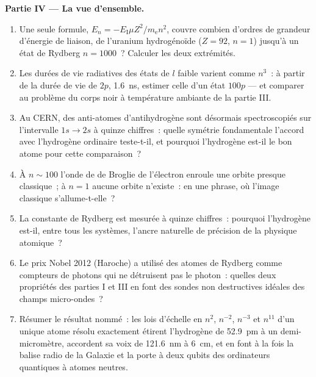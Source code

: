 \begin{problem}
\medskip\noindent\textbf{Partie IV --- La vue d'ensemble.}
\begin{enumerate}[resume]
  \item Une seule formule, $E_n = -E_{\text{I}}\mu Z^2/m_{\text{e}}n^2$,
        couvre combien d'ordres de grandeur d'énergie de liaison, de
        l'uranium hydrogénoïde ($Z = 92$, $n = 1$) jusqu'à un état de
        Rydberg $n = 1000$~? Calculer les deux extrémités.
  \item Les durées de vie radiatives des états de $l$ faible varient
        comme $n^3$~: à partir de la durée de vie de $2p$,
        \qty{1.6}{ns}, estimer celle d'un état $100p$ --- et
        comparer au problème du corps noir à température ambiante de
        la partie III.
  \item Au CERN, des anti-atomes d'antihydrogène sont désormais
        spectroscopiés sur l'intervalle $1s \to 2s$ à quinze
        chiffres~: quelle symétrie fondamentale l'accord avec
        l'hydrogène ordinaire teste-t-il, et pourquoi l'hydrogène
        est-il le bon atome pour cette comparaison~?
  \item À $n \sim 100$ l'onde de de Broglie de l'électron enroule une
        orbite presque classique~; à $n = 1$ aucune orbite n'existe~:
        en une phrase, où l'image classique s'allume-t-elle~?
  \item La constante de Rydberg est mesurée à quinze chiffres~:
        pourquoi l'hydrogène est-il, entre tous les systèmes, l'ancre
        naturelle de précision de la physique atomique~?
  \item Le prix Nobel 2012 (Haroche) a utilisé des atomes de Rydberg
        comme compteurs de photons qui ne détruisent pas le photon~:
        quelles deux propriétés des parties I et III en font des
        sondes non destructives idéales des champs micro-ondes~?
  \item Résumer le résultat nommé~: les lois d'échelle en $n^2$,
        $n^{-2}$, $n^{-3}$ et $n^{11}$ d'un unique atome résolu
        exactement étirent l'hydrogène de \qty{52.9}{pm} à un
        demi-micromètre, accordent sa voix de \qty{121.6}{nm} à
        \qty{6}{cm}, et en font à la fois la balise radio de la
        Galaxie et la porte à deux qubits des ordinateurs quantiques
        à atomes neutres.
\end{enumerate}
\end{problem}
